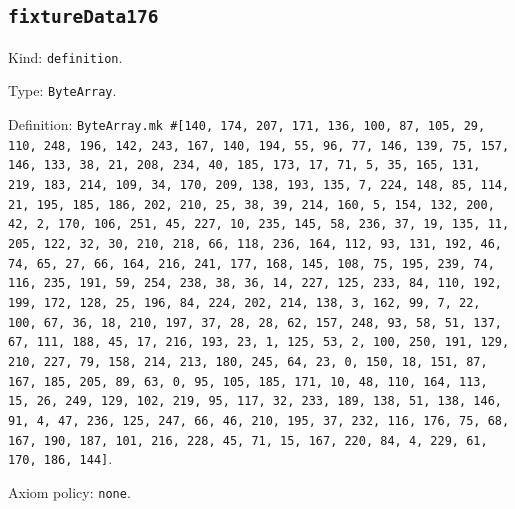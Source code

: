 \documentclass[11pt]{article}
\begin{document}
\subsection*{\texttt{fixtureData176}}
\noindent Kind: \texttt{definition}.\par
\noindent Type: \texttt{ByteArray}.\par
\noindent Definition: \texttt{ByteArray.mk \#[140, 174, 207, 171, 136, 100, 87, 105, 29, 110, 248, 196, 142, 243, 167, 140, 194, 55, 96, 77, 146, 139, 75, 157, 146, 133, 38, 21, 208, 234, 40, 185, 173, 17, 71, 5, 35, 165, 131, 219, 183, 214, 109, 34, 170, 209, 138, 193, 135, 7, 224, 148, 85, 114, 21, 195, 185, 186, 202, 210, 25, 38, 39, 214, 160, 5, 154, 132, 200, 42, 2, 170, 106, 251, 45, 227, 10, 235, 145, 58, 236, 37, 19, 135, 11, 205, 122, 32, 30, 210, 218, 66, 118, 236, 164, 112, 93, 131, 192, 46, 74, 65, 27, 66, 164, 216, 241, 177, 168, 145, 108, 75, 195, 239, 74, 116, 235, 191, 59, 254, 238, 38, 36, 14, 227, 125, 233, 84, 110, 192, 199, 172, 128, 25, 196, 84, 224, 202, 214, 138, 3, 162, 99, 7, 22, 100, 67, 36, 18, 210, 197, 37, 28, 28, 62, 157, 248, 93, 58, 51, 137, 67, 111, 188, 45, 17, 216, 193, 23, 1, 125, 53, 2, 100, 250, 191, 129, 210, 227, 79, 158, 214, 213, 180, 245, 64, 23, 0, 150, 18, 151, 87, 167, 185, 205, 89, 63, 0, 95, 105, 185, 171, 10, 48, 110, 164, 113, 15, 26, 249, 129, 102, 219, 95, 117, 32, 233, 189, 138, 51, 138, 146, 91, 4, 47, 236, 125, 247, 66, 46, 210, 195, 37, 232, 116, 176, 75, 68, 167, 190, 187, 101, 216, 228, 45, 71, 15, 167, 220, 84, 4, 229, 61, 170, 186, 144]}.\par
\noindent Axiom policy: \texttt{none}.\par
\end{document}

